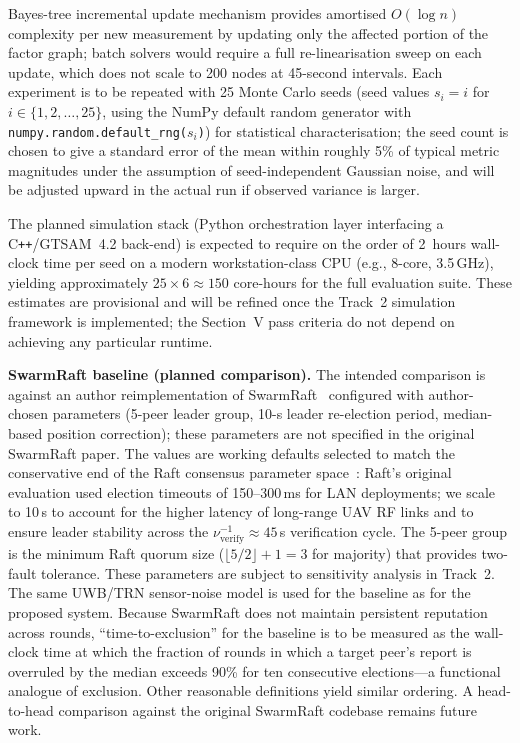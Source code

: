 \documentclass[conference,10pt]{IEEEtran}
\begin{document}
Bayes-tree incremental update mechanism provides amortised $O(\log n)$ complexity per new measurement by updating only the affected portion of the factor graph; batch solvers would require a full re-linearisation sweep on each update, which does not scale to 200 nodes at 45-second intervals. Each experiment is to be repeated with 25 Monte Carlo seeds (seed values $s_i = i$ for $i \in \{1, 2, \ldots, 25\}$, using the NumPy default random generator with \texttt{numpy.random.default\_rng($s_i$)}) for statistical characterisation; the seed count is chosen to give a standard error of the mean within roughly 5\% of typical metric magnitudes under the assumption of seed-independent Gaussian noise, and will be adjusted upward in the actual run if observed variance is larger.

The planned simulation stack (Python orchestration layer interfacing a C\texttt{++}/GTSAM~4.2 back-end) is expected to require on the order of 2~hours wall-clock time per seed on a modern workstation-class CPU (e.g., 8-core, 3.5\,GHz), yielding approximately $25 \times 6 \approx 150$ core-hours for the full evaluation suite. These estimates are provisional and will be refined once the Track~2 simulation framework is implemented; the Section~V pass criteria do not depend on achieving any particular runtime.

\textbf{SwarmRaft baseline (planned comparison).} The intended comparison is against an author reimplementation of SwarmRaft~\cite{dev2025swarmraft} configured with author-chosen parameters (5-peer leader group, 10-s leader re-election period, median-based position correction); these parameters are not specified in the original SwarmRaft paper. The values are working defaults selected to match the conservative end of the Raft consensus parameter space~\cite{ongaro2014raft}: Raft's original evaluation used election timeouts of 150--300\,ms for LAN deployments; we scale to 10\,s to account for the higher latency of long-range UAV RF links and to ensure leader stability across the $\nu_\text{verify}^{-1} \approx 45$\,s verification cycle. The 5-peer group is the minimum Raft quorum size ($\lfloor 5/2 \rfloor + 1 = 3$ for majority) that provides two-fault tolerance. These parameters are subject to sensitivity analysis in Track~2. The same UWB/TRN sensor-noise model is used for the baseline as for the proposed system. Because SwarmRaft does not maintain persistent reputation across rounds, ``time-to-exclusion'' for the baseline is to be measured as the wall-clock time at which the fraction of rounds in which a target peer's report is overruled by the median exceeds 90\% for ten consecutive elections---a functional analogue of exclusion. Other reasonable definitions yield similar ordering. A head-to-head comparison against the original SwarmRaft codebase remains future work.
\end{document}
